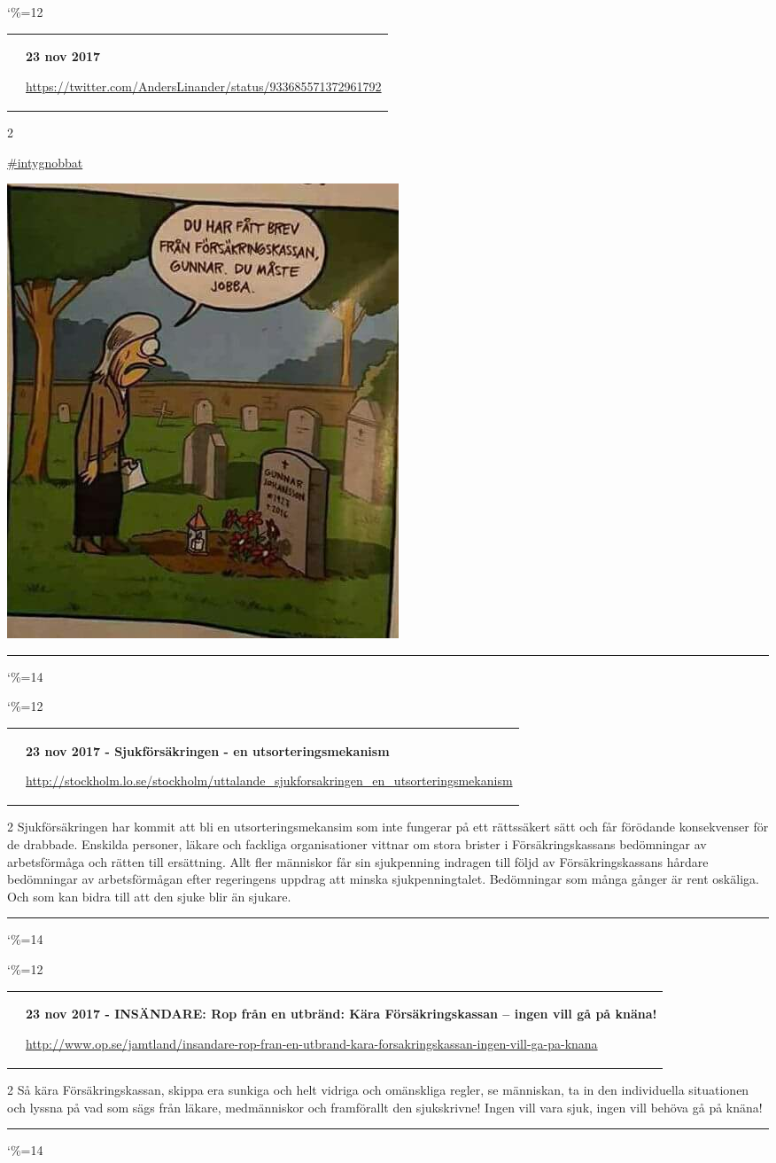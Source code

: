 \documentclass[a4paper]{article}
\makeatletter
\def\hash#1{
\href{http://twitter.com/hashtag/\directlua{tex.print(url_encode('#1'))}}{\##1}
}
\newcommand{\entry}{
\catcode`\%=12
\@entry}
\newcommand{\@entry}[4][]{
\bigskip
\begin{tabular*}{\textwidth}{l m{\textwidth-4cm}}
\qrcode{#4} & \textbf{#2}

\medskip

\url{#4}

\end{tabular*}

\medskip


\begin{multicols}{2}
#3
\end{multicols}

#1

\medskip
\hrule

\catcode`\%=14
}
\makeatother
\begin{document}
{{{{{\entry[{\includegraphics[width=\textwidth,height=\textheight,keepaspectratio]{DPUeE3UX4AAWH7G.jpg}}]{23 nov 2017}{\hash{intygnobbat}}{https://twitter.com/AndersLinander/status/933685571372961792}

\entry{23 nov 2017 - Sjukförsäkringen - en utsorteringsmekanism}{Sjukförsäkringen har kommit att bli en utsorteringsmekansim som inte fungerar på ett rättssäkert sätt och får förödande konsekvenser för de drabbade. Enskilda personer, läkare och fackliga organisationer vittnar om stora brister i Försäkringskassans bedömningar av arbetsförmåga och rätten till ersättning. Allt fler människor får sin sjukpenning indragen till följd av Försäkringskassans hårdare bedömningar av arbetsförmågan efter regeringens uppdrag att minska sjukpenningtalet. Bedömningar som många gånger är rent oskäliga. Och som kan bidra till att den sjuke blir än sjukare.}{http://stockholm.lo.se/stockholm/uttalande_sjukforsakringen_en_utsorteringsmekanism}

\entry{23 nov 2017 - INSÄNDARE: Rop från en utbränd: Kära Försäkringskassan – ingen vill gå på knäna!}{Så kära Försäkringskassan, skippa era sunkiga och helt vidriga och omänskliga regler, se människan, ta in den individuella situationen och lyssna på vad som sägs från läkare, medmänniskor och framförallt den sjukskrivne! Ingen vill vara sjuk, ingen vill behöva gå på knäna!}{http://www.op.se/jamtland/insandare-rop-fran-en-utbrand-kara-forsakringskassan-ingen-vill-ga-pa-knana}

}}}}}
\end{document}
